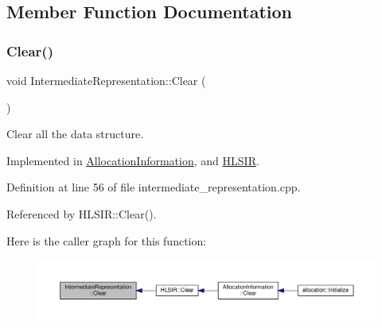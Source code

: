 \subsection{Member Function Documentation}
\mbox{\label{classIntermediateRepresentation_a93091bd456d4ca43bdbd41016c728c0d}} 
\subsubsection{\texorpdfstring{Clear()}{Clear()}}
{\footnotesize\ttfamily void Intermediate\+Representation\+::\+Clear (\begin{DoxyParamCaption}{ }\end{DoxyParamCaption})\hspace{0.3cm}{\ttfamily [pure virtual]}}



Clear all the data structure. 



Implemented in \hyperlink{classAllocationInformation_a2a8dda2a075950424083d9aff01267fe}{Allocation\+Information}, and \hyperlink{classHLSIR_afba475e313250d56bec388077d032624}{H\+L\+S\+IR}.



Definition at line 56 of file intermediate\+\_\+representation.\+cpp.



Referenced by H\+L\+S\+I\+R\+::\+Clear().

Here is the caller graph for this function\+:
\nopagebreak
\begin{figure}[H]
\begin{center}
\leavevmode
\includegraphics[width=350pt]{d7/dfa/classIntermediateRepresentation_a93091bd456d4ca43bdbd41016c728c0d_icgraph}
\end{center}
\end{figure}
\mbox{\label{classIntermediateRepresentation_ae09602bb8001b048690ce2a48347db36}} 
